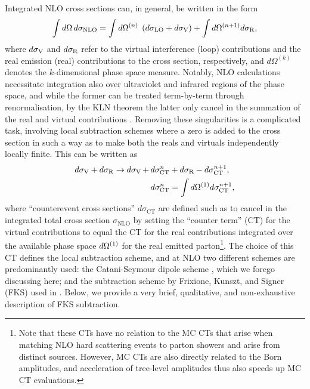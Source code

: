 \documentclass[a4paper,11pt]{article}
\begin{document}
Integrated NLO cross sections can, in general, be written in the form
\begin{align}
    \int d\Omega \, d\sigma_{\mathrm{NLO}}{} = \int d \Omega^{(n)} \; \left(d\sigma_{\mathrm{LO}}{} + d\sigma_{\mathrm{V}}{}\right) + \int d\Omega^{(n+1)} d\sigma_{\mathrm{R}}{},
\end{align}
where $d\sigma_{\mathrm{V}}{}$ and $d\sigma_{\mathrm{R}}{}$ refer to the virtual interference (loop) contributions and the real emission (real) contributions to the cross section, respectively, and $d\Omega^{(k)}$ denotes the $k$-dimensional phase space measure. Notably, NLO calculations necessitate integration also over ultraviolet and infrared regions of the phase space, and while the former can be treated term-by-term through renormalisation, by the KLN theorem the latter only cancel in the summation of the real and virtual contributions \cite{10.1143/PTP.17.401,Kinoshita:1962ur,PhysRev.133.B1549}. Removing these singularities is a complicated task, involving local subtraction schemes where a zero is added to the cross section in such a way as to make both the reals and virtuals independently locally finite. This can be written as
\begin{align}
     d\sigma_{\mathrm{V}}{} + d\sigma_{\mathrm{R}}{} \to d\sigma_{\mathrm{V}}{}\, +\,  &d\sigma_{\mathrm{CT}}^{n}{} + d\sigma_{\mathrm{R}}{} - d\sigma_{\mathrm{CT}}^{n+1}{},\\
     &d\sigma_{\mathrm{CT}}^{n}{} = \int d\Omega^{(1)} d\sigma_{\mathrm{CT}}^{n+1}{},
\end{align}
where ``counterevent cross sections'' $d\sigma_{\mathrm{CT}}$ are defined such as to cancel in the integrated total cross section $\sigma_{\mathrm{NLO}}$ by setting the ``counter term'' (CT) for the virtual contributions to equal the CT for the real contributions integrated over the available phase space $d\Omega^{(1)}$ for the real emitted parton\footnote{Note that these CTs have no relation to the MC CTs that arise when matching NLO hard scattering events to parton showers and arise from distinct sources. However, MC CTs are also directly related to the Born amplitudes, and acceleration of tree-level amplitudes thus also speeds up MC CT evaluations.}. The choice of this CT defines the local subtraction scheme, and
at NLO two different schemes are predominantly used: the Catani-Seymour dipole scheme \cite{Catani:1996jh,Catani:1996vz,Catani:2002hc}, which we forego discussing here; and the subtraction scheme by Frixione, Kunszt, and Signer (FKS) \cite{Frixione:1995ms,Frixione:1997np} used in \mg{}. Below, we provide a very brief, qualitative, and non-exhaustive description of FKS subtraction.
\end{document}
